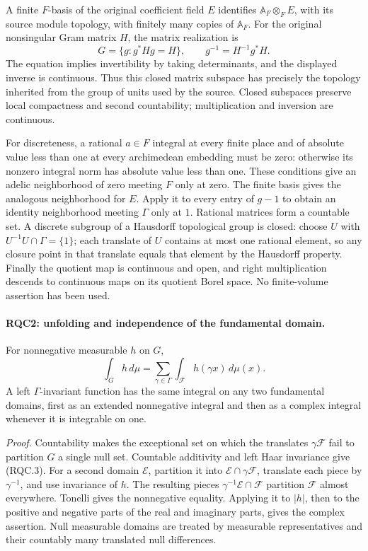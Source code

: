 \documentclass[11pt,a4paper]{article}
\numberwithin{equation}{section}
\theoremstyle{remark}\newtheorem{remark}[theorem]{Remark}
\begin{document}
A finite \(F\)-basis of the original coefficient field \(E\)
identifies \(\mathbb A_F\otimes_F E\), with its source module
topology, with finitely many copies of \(\mathbb A_F\).  For the
original nonsingular Gram matrix \(H\), the matrix realization is
\[
 G=\{g:g^*Hg=H\},\qquad g^{-1}=H^{-1}g^*H.
 \tag{RQC.2}
\]
The equation implies invertibility by taking determinants, and the
displayed inverse is continuous.  Thus this closed matrix subspace
has precisely the topology inherited from the group of units used
by the source.  Closed subspaces preserve local compactness and
second countability; multiplication and inversion are continuous.

For discreteness, a rational \(a\in F\) integral at every finite
place and of absolute value less than one at every archimedean
embedding must be zero: otherwise its nonzero integral norm has
absolute value less than one.  These conditions give an adelic
neighborhood of zero meeting \(F\) only at zero.  The finite basis
gives the analogous neighborhood for \(E\).  Apply it to every
entry of \(g-1\) to obtain an identity neighborhood meeting
\(\Gamma\) only at \(1\).  Rational matrices form a countable set.
A discrete subgroup of a Hausdorff topological group is closed:
choose \(U\) with \(U^{-1}U\cap\Gamma=\{1\}\); each translate of
\(U\) contains at most one rational element, so any closure point
in that translate equals that element by the Hausdorff property.
Finally the quotient map is continuous and open, and right
multiplication descends to continuous maps on its quotient Borel
space.  No finite-volume assertion has been used.

\paragraph{RQC2: unfolding and independence of the fundamental domain.}
\label{claim:RQC2}
For nonnegative measurable \(h\) on \(G\),
\[
 \int_G h\,d\mu
 =\sum_{\gamma\in\Gamma}\int_{\mathcal F}h(\gamma x)\,d\mu(x).
 \tag{RQC.3}
\]
A left \(\Gamma\)-invariant function has the same integral on any
two fundamental domains, first as an extended nonnegative integral
and then as a complex integral whenever it is integrable on one.

\emph{Proof.}
Countability makes the exceptional set on which the translates
\(\gamma\mathcal F\) fail to partition \(G\) a single null set.
Countable additivity and left Haar invariance give (RQC.3).
For a second domain \(\mathcal E\), partition it into
\(\mathcal E\cap\gamma\mathcal F\), translate each piece by
\(\gamma^{-1}\), and use invariance of \(h\).
The resulting pieces \(\gamma^{-1}\mathcal E\cap\mathcal F\)
partition \(\mathcal F\) almost everywhere.  Tonelli gives the
nonnegative equality.  Applying it to \(|h|\), then to the positive
and negative parts of the real and imaginary parts, gives the
complex assertion.  Null measurable domains are treated by
measurable representatives and their countably many translated null
differences.
\end{document}
